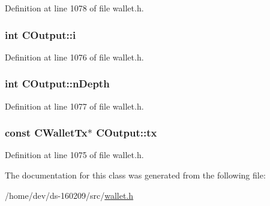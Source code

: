 Definition at line 1078 of file wallet.\+h.

\hypertarget{class_c_output_ae1b3534a41afb09bb04a499017f2821e}{}
\subsubsection[{i}]{\setlength{\rightskip}{0pt plus 5cm}int C\+Output\+::i}\label{class_c_output_ae1b3534a41afb09bb04a499017f2821e}


Definition at line 1076 of file wallet.\+h.

\hypertarget{class_c_output_a2eb24fc73c35fcc551b736d68bd1c64a}{}
\subsubsection[{n\+Depth}]{\setlength{\rightskip}{0pt plus 5cm}int C\+Output\+::n\+Depth}\label{class_c_output_a2eb24fc73c35fcc551b736d68bd1c64a}


Definition at line 1077 of file wallet.\+h.

\hypertarget{class_c_output_ad5c15e7a2dc48258127b8fd5db421ad5}{}
\subsubsection[{tx}]{\setlength{\rightskip}{0pt plus 5cm}const {\bf C\+Wallet\+Tx}$\ast$ C\+Output\+::tx}\label{class_c_output_ad5c15e7a2dc48258127b8fd5db421ad5}


Definition at line 1075 of file wallet.\+h.



The documentation for this class was generated from the following file\+:\begin{DoxyCompactItemize}
\item 
/home/dev/ds-\/160209/src/\hyperlink{wallet_8h}{wallet.\+h}\end{DoxyCompactItemize}
